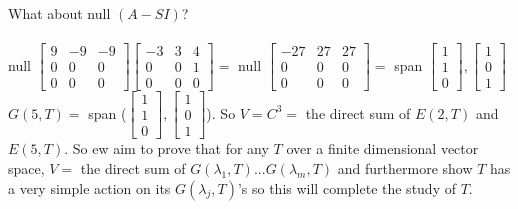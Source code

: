 \documentclass{article}
\begin{document}
What about null $(A - SI)$?\\\\
null $\begin{bmatrix}
    9&-9&-9\\0&0&0\\0&0&0
\end{bmatrix} \begin{bmatrix}
    -3&3&4\\0&0&1\\0&0&0
\end{bmatrix} = $ null $\begin{bmatrix}
    -27&27&27\\0&0&0\\0&0&0
\end{bmatrix} =$ span $\begin{bmatrix}
    1\\1\\0
\end{bmatrix}, \begin{bmatrix}
    1\\0\\1
\end{bmatrix}$\\
$G(5,T) = $ span ($\begin{bmatrix}
    1\\1\\0
\end{bmatrix}, \begin{bmatrix}
    1\\0\\1
\end{bmatrix}$). So $V = C^3 = $ the direct sum of $E(2,T)$ and $E(5,T)$. So ew aim to prove that for any $T$ over a finite dimensional vector space, $V =$ the direct sum of $G(\lambda_1, T) ... G(\lambda _m, T)$ and furthermore show $T$ has a very simple action on its $G(\lambda_j, T)$'s so this will complete the study of $T$. 
\end{document}
